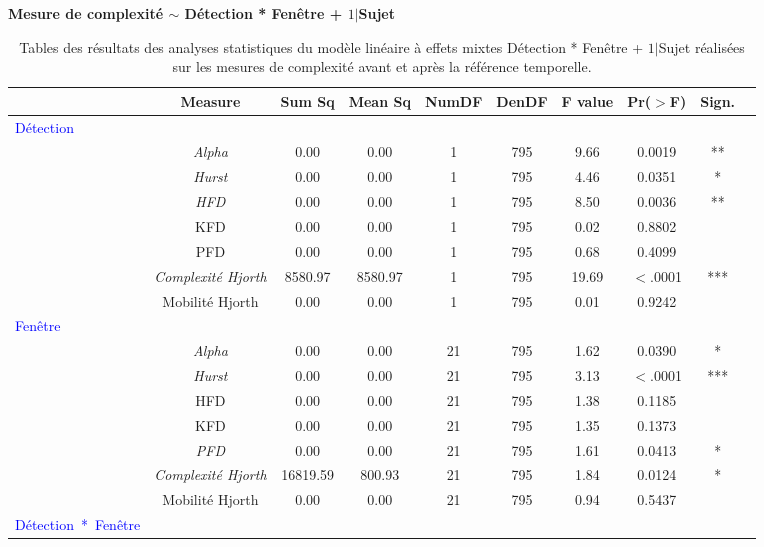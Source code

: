 \begin{table}[!t]
\centering
\scriptsize
\caption[Table des résultats des analyses statistiques pour les mesures de complexité fenêtrées du cluster FC]{Tables des résultats des analyses statistiques du modèle linéaire à effets mixtes Détection * Fenêtre + $1|$Sujet réalisées sur les mesures de complexité avant et après la référence temporelle.}
\label{tab:table5statsmesurescomplexitefenetre}

\textbf{Mesure de complexité $\sim$ Détection * Fenêtre + $1|$Sujet}

\begin{tabular}{|l|*{9}{c|}}
\hline
& \textbf{Measure} & \textbf{Sum Sq} & \textbf{Mean Sq} & \textbf{NumDF} & \textbf{DenDF} & \textbf{F value} & \textbf{Pr($>$F)} & \textbf{Sign.} \\ 
\hline
\textcolor{blue}{Détection} & & & & & & & & \\ 
\hline
& \textit{Alpha} & 0.00 & 0.00 & 1 & 795 & 9.66 & 0.0019 & ** \\ 
& \textit{Hurst} & 0.00 & 0.00 & 1 & 795 & 4.46 & 0.0351 & * \\ 
& \textit{HFD} & 0.00 & 0.00 & 1 & 795 & 8.50 & 0.0036 & ** \\ 
& KFD & 0.00 & 0.00 & 1 & 795 & 0.02 & 0.8802 & \\ 
& PFD & 0.00 & 0.00 & 1 & 795 & 0.68 & 0.4099 & \\ 
& \textit{Complexité Hjorth} & 8580.97 & 8580.97 & 1 & 795 & 19.69 & $<$.0001 & *** \\ 
& Mobilité Hjorth & 0.00 & 0.00 & 1 & 795 & 0.01 & 0.9242 & \\ 
\hline
\textcolor{blue}{Fenêtre} & & & & & & & & \\ 
\hline
& \textit{Alpha} & 0.00 & 0.00 & 21 & 795 & 1.62 & 0.0390 & * \\
& \textit{Hurst} & 0.00 & 0.00 & 21 & 795 & 3.13 & $<$.0001 & *** \\ 
& HFD & 0.00 & 0.00 & 21 & 795 & 1.38 & 0.1185 & \\ 
& KFD & 0.00 & 0.00 & 21 & 795 & 1.35 & 0.1373 & \\ 
& \textit{PFD} & 0.00 & 0.00 & 21 & 795 & 1.61 & 0.0413 & * \\ 
& \textit{Complexité Hjorth} & 16819.59 & 800.93 & 21 & 795 & 1.84 & 0.0124 & * \\ 
& Mobilité Hjorth & 0.00 & 0.00 & 21 & 795 & 0.94 & 0.5437 & \\ 
\hline
\textcolor{blue}{Détection~*~Fenêtre} & & & & & & & & \\ 

\end{tabular}
\end{table}
